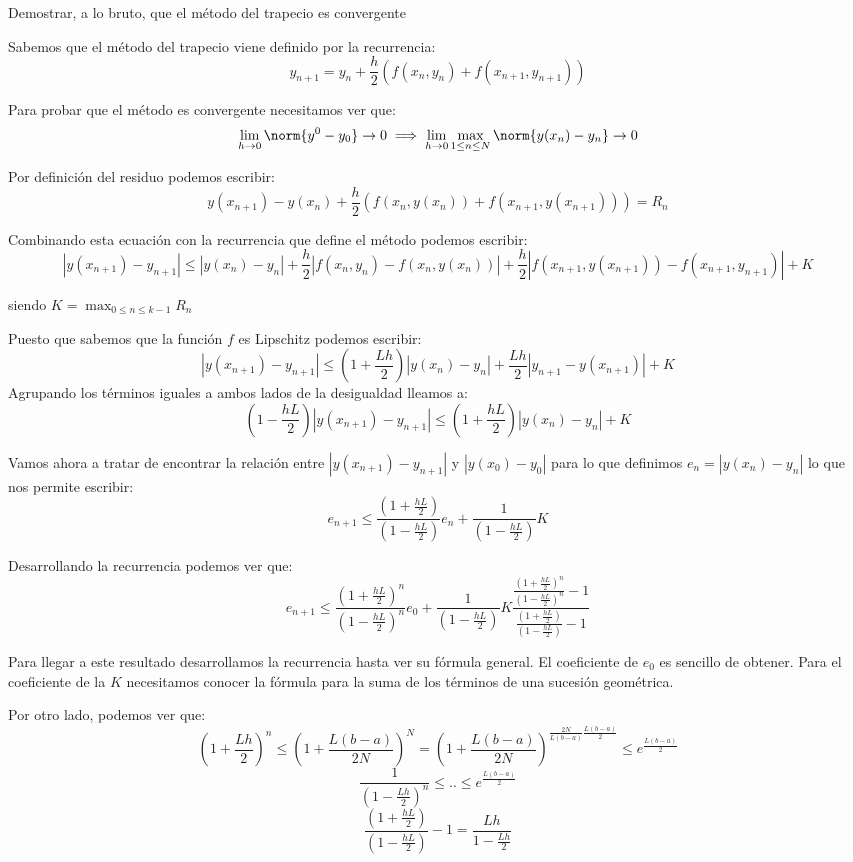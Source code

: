 \begin{problem}[2]
Demostrar, a lo bruto, que el método del trapecio es convergente

\solution

Sabemos que el método del trapecio viene definido por la recurrencia:
\[y_{n+1} = y_n +\frac{h}{2}\left(f(x_n,y_n)+f(x_{n+1},y_{n+1}) \right)\]

Para probar que el método es convergente necesitamos ver que:
\[\lim_{h \to 0 } \norm{y^0-y_0} \to 0 \implies \lim_{h\to 0} \max_{1 \leq n \leq N}\norm{y(x_n)-y_n} \to 0\]

Por definición del residuo podemos escribir:
\[y(x_{n+1}) - y(x_n) +\frac{h}{2}\left(f(x_n,y(x_n))+f(x_{n+1},y(x_{n+1})) \right) = R_n\]

Combinando esta ecuación con la recurrencia que define el método podemos escribir:
\[|y(x_{n+1})-y_{n+1}| \leq |y(x_n)-y_n|+\frac{h}{2}|f(x_n,y_n)-f(x_n,y(x_n))|+\frac{h}{2}|f(x_{n+1},y(x_{n+1}))-f(x_{n+1},y_{n+1})|+K\]

siendo $K=\max_{0 \leq n \leq k-1} R_n$

Puesto que sabemos que la función $f$ es Lipschitz podemos escribir:
\[|y(x_{n+1})-y_{n+1}| \leq \left( 1 + \frac{Lh}{2}\right)|y(x_n)-y_n|+\frac{Lh}{2}|y_{n+1}-y(x_{n+1})| + K\]
Agrupando los términos iguales a ambos lados de la desigualdad lleamos a:
\[\left(1- \frac{hL}{2}\right)|y(x_{n+1})-y_{n+1}| \leq \left(1+ \frac{hL}{2}\right)|y(x_n)-y_n| + K\]

Vamos ahora a tratar de encontrar la relación entre $|y(x_{n+1})-y_{n+1}|$ y $|y(x_0)-y_0|$ para lo que definimos $e_n=|y(x_{n})-y_{n}|$ lo que nos permite escribir:
\[e_{n+1} \leq \frac{\left(1+ \frac{hL}{2}\right)}{\left(1- \frac{hL}{2}\right)}e_n + \frac{1}{\left(1- \frac{hL}{2}\right)}K\]

Desarrollando la recurrencia podemos ver que:
\[e_{n+1} \leq \frac{\left(1+ \frac{hL}{2}\right)^n}{\left(1- \frac{hL}{2}\right)^n}e_0 + \frac{1}{\left(1- \frac{hL}{2}\right)}K\frac{\frac{\left(1+ \frac{hL}{2}\right)^n}{\left(1- \frac{hL}{2}\right)^n}-1}{\frac{\left(1+ \frac{hL}{2}\right)}{\left(1- \frac{hL}{2}\right)}-1}\]

\obs Para llegar a este resultado desarrollamos la recurrencia hasta ver su fórmula general. El coeficiente de $e_0$ es sencillo de obtener. Para el coeficiente de la $K$ necesitamos conocer la fórmula para la suma de los términos de una sucesión geométrica.

Por otro lado, podemos ver que:
\[\left( 1 + \frac{Lh}{2} \right)^n \leq \left( 1 + \frac{L(b-a)}{2N}\right)^N=\left(1 + \frac{L(b-a)}{2N}\right)^{\frac{2N}{L(b-a)}\frac{L(b-a)}{2}}\leq e^{\frac{L(b-a)}{2}}\]
\[\frac{1}{\left( 1-\frac{Lh}{2}\right)^n} \leq .. \leq e^{\frac{L(b-a)}{2}}\]
\[\frac{\left(1+ \frac{hL}{2}\right)}{\left(1- \frac{hL}{2}\right)}-1 = \frac{Lh}{1-\frac{Lh}{2}}\]


\end{problem}

